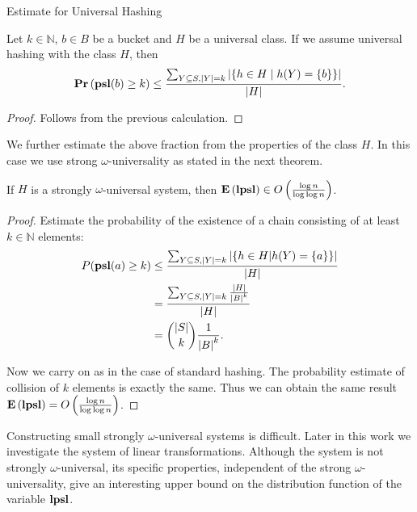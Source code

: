 \begin{section}{Estimate for Universal Hashing}
\begin{claim}
Let $k \in \mathbb{N}$, $b \in B$ be a bucket and $H$ be a universal class. If we assume universal hashing with the class $H$, then
\[
	\mathbf{Pr}\left(\mathbf{psl}(b) \geq k\right) \leq \frac{\sum\displaylimits_{Y \subseteq S, |Y| = k} | \{ h \in H \mid h(Y) = \{ b \} \}|}{|H|} \text{.}
\]
\end{claim}
\begin{proof}
Follows from the previous calculation.
\end{proof}

We further estimate the above fraction from the properties of the class $H$. In this case we use strong $\omega$-universality as stated in the next theorem.

\begin{theorem}
If $H$ is a strongly $\omega$-universal system, then $\mathbf{E}\left(\mathbf{lpsl}\right) \in O\left(\frac{\log n}{\log \log n}\right)$.
\end{theorem}
\begin{proof}
Estimate the probability of the existence of a chain consisting of at least $k \in \mathbb{N}$ elements:
\begin{displaymath}
\begin{split}
P(\mathbf{psl}(a) \geq k) 
	& \leq \frac{\sum\displaylimits_{Y \subseteq S, |Y| = k} | \{ h \in H | h(Y) = \{a\} \}|}{|H|} \\
	& = \frac{\sum\displaylimits_{Y \subseteq S, |Y| = k} \frac{|H|}{{|B|}^{k}}}{|H|} \\
	& = \dbinom{|S|}{k}\frac{1}{{|B|}^k} \text{.}
\end{split}
\end{displaymath}

Now we carry on as in the case of standard hashing. The probability estimate of collision of $k$ elements is exactly the same. Thus we can obtain the same result $\mathbf{E}\left(\mathbf{lpsl}\right) = O\left(\frac{\log n}{\log \log n}\right)$.
\end{proof}

Constructing small strongly $\omega$-universal systems is difficult. Later in this work we investigate the system of linear transformations. Although the system is not strongly $\omega$-universal, its specific properties, independent of the strong $\omega$-universality, give an interesting upper bound on the distribution function of the variable $\mathbf{lpsl}$.
\end{section}
